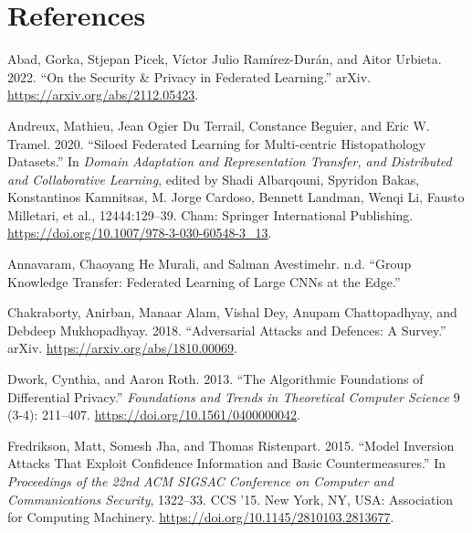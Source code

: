 \documentclass[
  compsoc]{IEEEtran}
\newlength{\cslhangindent}
\newlength{\cslentryspacingunit} %
\newenvironment{CSLReferences}[2] %
 {%
  \setlength{\parindent}{0pt}
  \ifodd #1
  \let\oldpar\par
  \def\par{\hangindent=\cslhangindent\oldpar}
  \fi
  \setlength{\parskip}{#2\cslentryspacingunit}
 }%
 {}
\begin{document}
\hypertarget{references}{%
\section*{References}\label{references}}

\hypertarget{refs}{}
\begin{CSLReferences}{1}{0}
\leavevmode{}%
Abad, Gorka, Stjepan Picek, Víctor Julio Ramírez-Durán, and Aitor
Urbieta. 2022. {``On the {Security} \& {Privacy} in {Federated
Learning}.''} {arXiv}. \url{https://arxiv.org/abs/2112.05423}.

\leavevmode{}%
Andreux, Mathieu, Jean Ogier Du Terrail, Constance Beguier, and Eric W.
Tramel. 2020. {``Siloed {Federated Learning} for {Multi-centric
Histopathology Datasets}.''} In \emph{Domain {Adaptation} and
{Representation Transfer}, and {Distributed} and {Collaborative
Learning}}, edited by Shadi Albarqouni, Spyridon Bakas, Konstantinos
Kamnitsas, M. Jorge Cardoso, Bennett Landman, Wenqi Li, Fausto
Milletari, et al., 12444:129--39. {Cham}: {Springer International
Publishing}. \url{https://doi.org/10.1007/978-3-030-60548-3_13}.

\leavevmode{}%
Annavaram, Chaoyang He Murali, and Salman Avestimehr. n.d. {``Group
{Knowledge Transfer}: {Federated Learning} of {Large CNNs} at the
{Edge}.''}

\leavevmode{}%
Chakraborty, Anirban, Manaar Alam, Vishal Dey, Anupam Chattopadhyay, and
Debdeep Mukhopadhyay. 2018. {``Adversarial {Attacks} and {Defences}: {A
Survey}.''} {arXiv}. \url{https://arxiv.org/abs/1810.00069}.

\leavevmode{}%
Dwork, Cynthia, and Aaron Roth. 2013. {``The {Algorithmic Foundations}
of {Differential Privacy}.''} \emph{Foundations and
Trends\textregistered{} in Theoretical Computer Science} 9 (3-4):
211--407. \url{https://doi.org/10.1561/0400000042}.

\leavevmode{}%
Fredrikson, Matt, Somesh Jha, and Thomas Ristenpart. 2015. {``Model
{Inversion Attacks} That {Exploit Confidence Information} and {Basic
Countermeasures}.''} In \emph{Proceedings of the 22nd {ACM SIGSAC
Conference} on {Computer} and {Communications Security}}, 1322--33.
{CCS} '15. {New York, NY, USA}: {Association for Computing Machinery}.
\url{https://doi.org/10.1145/2810103.2813677}.


\end{CSLReferences}
\end{document}

